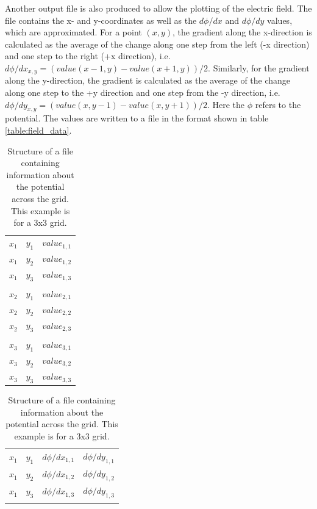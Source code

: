 Another output file is also produced to allow the plotting of the electric field. The file contains the x- and y-coordinates as well as the $d{\phi}/dx$ and $d{\phi}/dy$ values, which are approximated. For a point $(x,y)$, the gradient along the x-direction is calculated as the average of the change along one step from the left (-x direction) and one step to the right (+x direction), i.e. $d{\phi}/dx_{x,y} = ( value(x-1,y) - value(x+1,y) ) / 2$. Similarly, for the gradient along the y-direction, the gradient is calculated as the average of the change along one step to the +y direction and one step from the -y direction, i.e. $d{\phi}/dy_{x,y} = ( value(x,y-1) - value(x,y+1) ) / 2$. Here the $\phi$ refers to the potential. The values are written to a file in the format shown in table \ref{table:field_data}.
\begin{table}
    \parbox{0.47\linewidth}{
    \centering
    \begin{tabularx}{0.44\textwidth}{ |XXX| }
        \hline
        $x_1$ & $y_1$ & $value_{1,1}$ \\
        $x_1$ & $y_2$ & $value_{1,2}$ \\
        $x_1$ & $y_3$ & $value_{1,3}$ \\
        & & \\
        $x_2$ & $y_1$ & $value_{2,1}$ \\
        $x_2$ & $y_2$ & $value_{2,2}$ \\
        $x_2$ & $y_3$ & $value_{2,3}$ \\
        & & \\
        $x_3$ & $y_1$ & $value_{3,1}$ \\
        $x_3$ & $y_2$ & $value_{3,2}$ \\
        $x_3$ & $y_3$ & $value_{3,3}$ \\
        \hline
    \end{tabularx}
    \caption{Structure of a file containing information about the potential across the grid. This example is for a 3x3 grid.}
    \label{table:potential_data}
    }
    \hfill
    \parbox{0.47\linewidth}{
    \centering
    \begin{tabularx}{0.44\textwidth}{ |XXXX| }
        \hline
        $x_1$ & $y_1$ & $d{\phi}/dx_{1,1}$ & $d{\phi}/dy_{1,1}$ \\
        $x_1$ & $y_2$ & $d{\phi}/dx_{1,2}$ & $d{\phi}/dy_{1,2}$ \\
        $x_1$ & $y_3$ & $d{\phi}/dx_{1,3}$ & $d{\phi}/dy_{1,3}$ \\
        & & & \\

\end{tabularx}}
\end{table}
